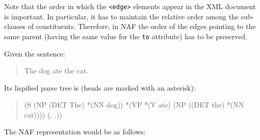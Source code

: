 Note that the order in which the \texttt{<edge>} elements appear in the XML
document is important. In particular, it has to maintain the relative order
among the sub-clauses of constituents. Therefore, in NAF the order of the
edges pointing to the same parent (having the same value for the \texttt{to}
attribute) has to be preserved.

Given the sentence:

\begin{quote}
  The dog ate the cat.  
\end{quote}

Its lispified parse tree is (heads are marked with an asterisk):
\begin{quote}
  (S (NP (DET The) *(NN dog)) *(VP *(V ate) (NP ((DET the) *(NN cat)))) (. .))
\end{quote}

The NAF representation would be as follows:

